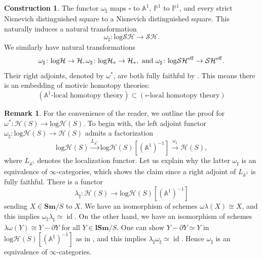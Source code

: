\documentclass[11pt, a4paper]{amsart}
\theoremstyle{definition}
\newtheorem{const}[thm]{Construction}
\newtheorem{rmk}[thm]{Remark}
\numberwithin{equation}{subsection}
\renewcommand{\P}{\mathbb{P}}
\newcommand{\A}{\mathbb{A}}
\newcommand{\Sm}{\mathbf{Sm}}
\newcommand{\lSm}{\mathbf{lSm}}
\newcommand{\id}{\operatorname{id}}   			%
\newcommand{\sharpp}{\sharp}
\newcommand{\boxx}{\square}
\newcommand{\eff}{{\rm eff}}
\newcommand{\infSH}{\mathcal{SH}}
\newcommand{\infSHS}{\mathcal{SH}^{\eff}}
\newcommand{\infH}{\mathcal{H}}
\newcommand{\infHpt}{\mathcal{H}_{\ast}}
\newcommand{\inflogH}{\mathrm{log}\mathcal{H}}
\newcommand{\inflogHpt}{\mathrm{log}\mathcal{H}_\ast}
\newcommand{\inflogSH}{\mathrm{log}\mathcal{SH}}
\newcommand{\inflogSHS}{\mathrm{log}\mathcal{SH}^{\mathrm{eff}}}
\begin{document}
\begin{const}
\label{compth.7}
The functor $\omega_\sharpp$ maps $\boxx$ to $\A^1$, $\P^1$ to $\P^1$, and every strict Nisnevich distinguished square to a Nisnevich distinguished square.
This naturally induces a natural transformation
\[
\omega_\sharpp
\colon
\inflogSH
\to
\infSH.
\]
We similarly have natural transformations
\[
\omega_\sharpp \colon \inflogH \to \infH,
\omega_\sharpp\colon \inflogHpt\to \infHpt,
\text{ and }
\omega_\sharpp \colon \inflogSHS \to \infSHS.
\]
Their right adjoints, denoted by $\omega^*$,
are both fully faithful by \cite[Proposition 2.5.7]{logA1}.
This means there is an embedding of motivic homotopy theories:
\[
(\A^1\text{-local homotopy theory})
\subset
(\boxx\text{-local homotopy theory})
\]

\begin{rmk} For the convenience of the reader,
we outline the proof for $\omega^*\colon \infH(S)\to \inflogH(S)$.
To begin with, 
the left adjoint functor $\omega_\sharp\colon \inflogH(S)\to \infH(S)$ admits a factorization
\[
\inflogH(S)
\xrightarrow{L_{\A^1}}
\inflogH(S)[(\A^1)^{-1}]
\xrightarrow{\omega_\sharp}
\infH(S),
\]
where $L_{\A^1}$ denotes the localization functor.
Let us explain why the latter $\omega_\sharp$ is an equivalence of $\infty$-categories, 
which shows the claim since a right adjoint of $L_{\A^1}$ is fully faithful.
There is a functor
\[
\lambda_\sharp
\colon
\infH(S)
\to
\inflogH(S)[(\A^1)^{-1}]
\]
sending $X\in \Sm/S$ to $X$.
We have an isomorphism of schemes $\omega\lambda(X)\cong X$,
and this implies $\omega_\sharp \lambda_\sharp\simeq \id$.
On the other hand,
we have an isomorphism of schemes $\lambda\omega(Y)\cong Y-\partial Y$ for all $Y\in \lSm/S$.
One can show $Y-\partial Y\simeq Y$ in $\inflogH(S)[(\A^1)^{-1}]$ as in \cite[Proposition 2.4.3]{logA1},
and this implies $\lambda_\sharp \omega_\sharp \simeq \id$.
Hence $\omega_\sharp$ is an equivalence of $\infty$-categories.\end{rmk}
\end{const}
\end{document}
